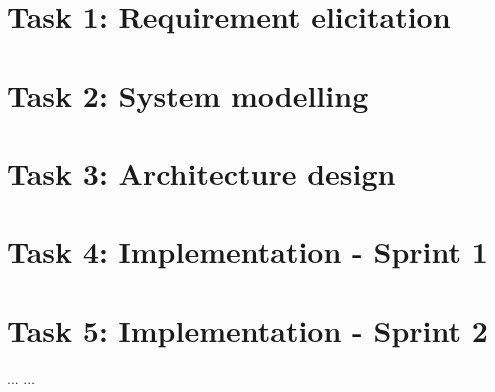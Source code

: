 \documentclass[a4paper]{article}
\begin{document}
	
	
	\newpage
	\tableofcontents
	\newpage
	
	
	\section{Task 1: Requirement elicitation}
	
        
        
        
        \newpage
	\section{Task 2: System modelling}
        
        
	
        

        \newpage
	\section{Task 3: Architecture design}
        
        
        
        
        
        
        
        
    \newpage
	\section{Task 4: Implementation - Sprint 1}
	
	\section{Task 5: Implementation - Sprint 2}
	
	
	\newpage
	\begin{thebibliography}{80}
		...
		...
	\end{thebibliography}
\end{document}
